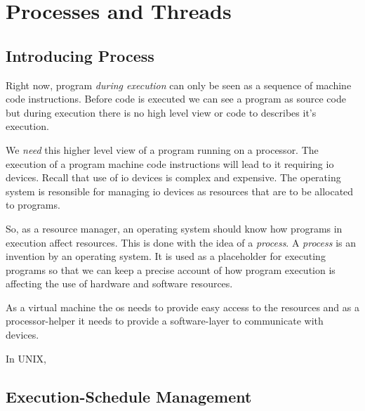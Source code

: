 
\chapter{Processes and Threads}





\section{Introducing Process}


Right now, program \textit{during execution} can only be seen as a sequence of machine code instructions. Before code is executed we can see a program as source code but during 
execution there is no high level view or code to describes it's execution.

We \textit{need} this higher level view of a program running on a processor.
The execution of a program machine code instructions will lead to it requiring io devices.
Recall that use of io devices is complex and expensive. 
The operating system is resonsible for managing io devices as resources that 
are to be allocated to programs.

So, as a resource manager, an operating system should know how programs in 
execution affect resources. This is done with the idea of a \textit{process}. 
A \textit{process} is an invention by an operating system. 
It is used as a placeholder for executing programs so that we can keep a precise 
account of how program execution is affecting the use of hardware and software resources.


As a virtual machine the os needs to provide easy access to the 
resources and as a processor-helper it
needs to provide a software-layer to communicate with devices.

In UNIX, 


\section{Execution-Schedule Management}